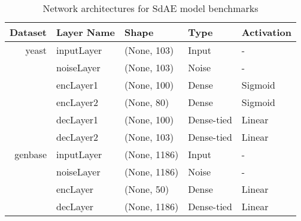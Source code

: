 \begin{table}[!h]
    \centering
    \caption{Network architectures for SdAE model benchmarks}
    \begin{tabular}{@{}r*{4}{l}@{}}
    \toprule
    Dataset & Layer Name     & Shape        & Type          & Activation          \\ \midrule
    yeast   & inputLayer     & (None, 103)  & Input         & -                   \\
            & noiseLayer     & (None, 103)  & Noise         & -                   \\
            & encLayer1      & (None, 100)  & Dense         & Sigmoid             \\
            & encLayer2      & (None, 80)   & Dense         & Sigmoid             \\
            & decLayer1      & (None, 100)  & Dense-tied    & Linear              \\
            & decLayer2      & (None, 103)  & Dense-tied    & Linear              \\ \midrule
    genbase & inputLayer     & (None, 1186) & Input         & -                   \\
            & noiseLayer     & (None, 1186) & Noise         & -                   \\
            & encLayer       & (None, 50)   & Dense         & Linear              \\
            & decLayer       & (None, 1186) & Dense-tied    & Linear               \\ \bottomrule
    \end{tabular}
\end{table}

